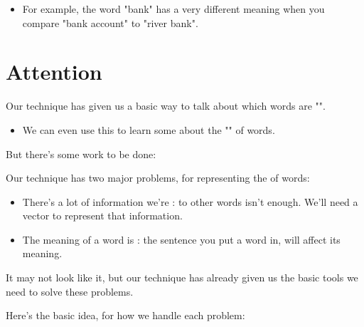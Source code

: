         \begin{itemize}
            \item \miniex For example, the word "bank" has a very different meaning when you compare "bank account" to "river bank".
        \end{itemize}

    

\pagebreak
    
\section{Attention}

    Our  technique has given us a basic way to talk about which words are "".

    \begin{itemize}
        \item We can even use this to learn some about the "" of words.
    \end{itemize}

    But there's some work to be done:\\

    \begin{concept}
        Our  technique has two major problems, for representing the  of words:

        \begin{itemize}
            \item There's a lot of information we're :  to other words isn't enough. We'll need a vector to represent that information.
    
            \item The meaning of a word is : the sentence you put a word in, will affect its meaning.
        \end{itemize}
    \end{concept}

    

    It may not look like it, but our  technique has already given us the basic tools we need to solve these problems.

    Here's the basic idea, for how we handle each problem:\\


